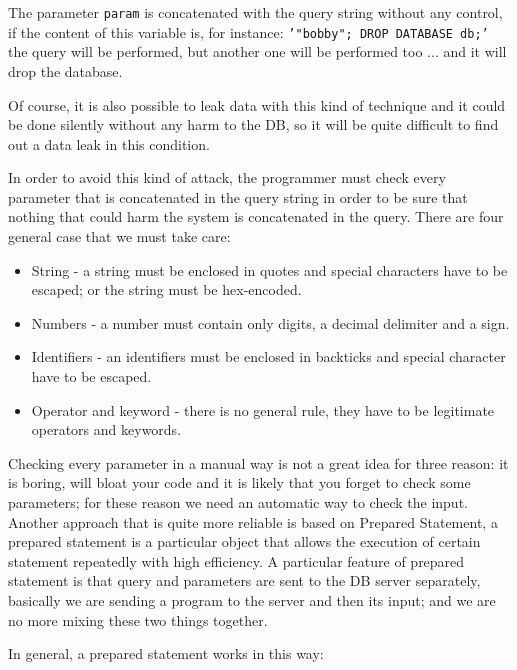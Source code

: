 The parameter \texttt{param} is concatenated with the query string without any control, if the content of this variable is, for instance:
\texttt{'"bobby"; DROP DATABASE db;'} the query will be performed, but another one will be performed too ... and it will drop the database.\newline

Of course, it is also possible to leak data with this kind of technique and it could be done silently without any harm to the DB, so it will be quite difficult to
find out a data leak in this condition.\newline

In order to avoid this kind of attack, the programmer must check every parameter that is concatenated in the query string in order to be sure that nothing that could harm
the system is concatenated in the query.\newline
There are four general case that we must take care:
\begin{itemize}
	\item String - a string must be enclosed in quotes and special characters have to be escaped; or the string must be hex-encoded.
	\item Numbers - a number must contain only digits, a decimal delimiter and a sign.
	\item Identifiers - an identifiers must be enclosed in backticks and special character have to be escaped.
	\item Operator and keyword - there is no general rule, they have to be legitimate operators and keywords.
\end{itemize}

Checking every parameter in a manual way is not a great idea for three reason: it is boring, will bloat your code and it is likely that you forget to check
some parameters; for these reason we need an automatic way to check the input. Another approach that is quite more reliable is based on Prepared Statement,
a prepared statement is a particular object that allows the execution of certain statement repeatedly with high efficiency.\newline
A particular feature of prepared statement is that query and parameters are sent to the DB server separately, basically we are sending a program to the server and then its input;
and we are no more mixing these two things together.\newline

In general, a prepared statement works in this way:

